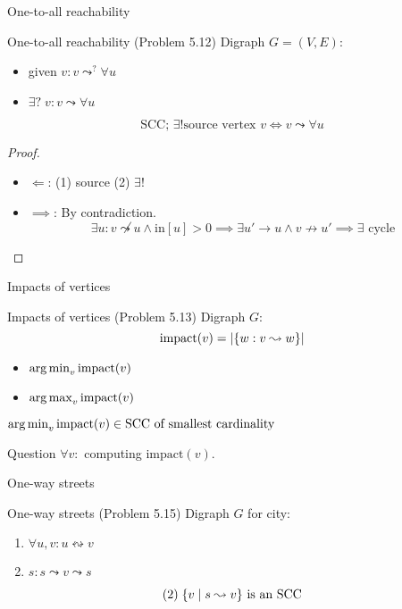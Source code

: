 \begin{frame}{One-to-all reachability}
  \begin{exampleblock}{One-to-all reachability (Problem 5.12)}
	Digraph $G = (V, E)$:
    \begin{itemize}
      \item given $v: v \leadsto^{?} \forall u$
      \item $\exists?\; v: v \leadsto \forall u$
    \end{itemize}
  \end{exampleblock}

  \pause
  \[
	\text{SCC; } \exists! \text{source vertex } v \iff v \leadsto \forall u
  \]

  \pause
  \begin{proof}
	\begin{itemize}
	  \item $\Longleftarrow$: (1) source (2) $\exists !$
		\pause
	  \item $\implies$: By contradiction. 
		\pause
		\[
		  \exists u: v \not\leadsto u \land \text{in}[u] > 0 \implies \exists u' \to u \land v \nrightarrow u' \implies \exists \text{ cycle}
		\]
	\end{itemize}
  \end{proof}
\end{frame}
\begin{frame}{Impacts of vertices}
  \begin{exampleblock}{Impacts of vertices (Problem 5.13)}
	Digraph $G$:
	\[
	  \text{impact}(v) = |\{w: v \leadsto w\}|
	\]

	\begin{itemize}
	  \item $\operatorname*{arg\,min}_{v} \text{impact}(v)$
	  \item $\operatorname*{arg\,max}_{v} \text{impact}(v)$
	\end{itemize}
  \end{exampleblock}

  \pause
  \vspace{0.50cm}
  \centerline{$\operatorname*{arg\,min}_{v} \text{impact}(v) \in \text{SCC of smallest cardinality}$}

  \pause
  \begin{alertblock}{Question}
	$\forall v:$ computing $\text{impact}(v)$.
  \end{alertblock}
\end{frame}
\begin{frame}{One-way streets}
  \begin{exampleblock}{One-way streets (Problem 5.15)}
	Digraph $G$ for city:
    \begin{enumerate}
      \item $\forall u,v: u \leftrightsquigarrow v$
      \item $s: s \leadsto v \leadsto s$
    \end{enumerate}
  \end{exampleblock}

  \pause
  \[
	(2)\; \{v \mid s \leadsto v\} \text{ is an SCC}
  \]
\end{frame}
